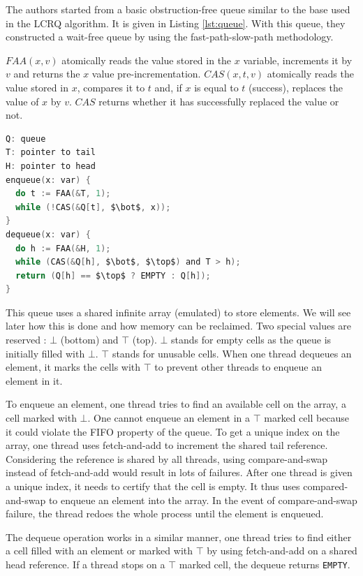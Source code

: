 The authors started from a basic obstruction-free queue similar to the base used
in the LCRQ algorithm. It is given in Listing \ref{lst:queue}. With this queue,
they constructed a wait-free queue by using the fast-path-slow-path methodology.

$FAA(x, v)$ atomically reads the value stored in the $x$ variable, increments it
by $v$ and returns the $x$ value pre-incrementation. $CAS(x, t, v)$ atomically
reads the value stored in $x$, compares it to $t$ and, if $x$ is equal to $t$
(success), replaces the value of $x$ by $v$. $CAS$ returns whether it has
successfully replaced the value or not.

\begin{lstlisting}[mathescape,
                   frame=single,
                   caption={An obstruction-free queue using an infinite array.},
                   label={lst:queue},
                   language=C]
Q: queue
T: pointer to tail
H: pointer to head
enqueue(x: var) {
  do t := FAA(&T, 1);
  while (!CAS(&Q[t], $\bot$, x));
}
dequeue(x: var) {
  do h := FAA(&H, 1);
  while (CAS(&Q[h], $\bot$, $\top$) and T > h);
  return (Q[h] == $\top$ ? EMPTY : Q[h]);
}
\end{lstlisting}

 This queue uses a shared infinite array (emulated) to store
elements. We will see later how this is done and how memory can be reclaimed.
Two special values are reserved : $\bot$ (bottom) and $\top$ (top). $\bot$
stands for empty cells as the queue is initially filled with $\bot$. $\top$
stands for unusable cells. When one thread dequeues an element, it marks the
cells with $\top$ to prevent other threads to enqueue an element in it.

To enqueue an element, one thread tries to find an available cell on the array,
a cell marked with $\bot$. One cannot enqueue an element in a $\top$ marked cell
because it could violate the FIFO property of the queue. To get a unique index
on the array, one thread uses fetch-and-add to increment the shared tail
reference. Considering the reference is shared by all threads, using
compare-and-swap instead of fetch-and-add would result in lots of failures.
After one thread is given a unique index, it needs to certify that the cell is
empty. It thus uses compared-and-swap to enqueue an element into the array. In
the event of compare-and-swap failure, the thread redoes the whole process until
the element is enqueued.

The dequeue operation works in a similar manner, one thread tries to find either a
cell filled with an element or marked with $\top$ by using fetch-and-add on a
shared head reference. If a thread stops on a $\top$ marked cell, the dequeue
returns \texttt{EMPTY}.

